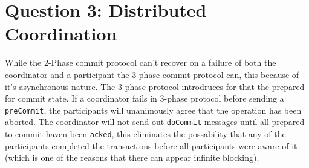\section{Question 3: Distributed Coordination}
While the 2-Phase commit protocol can't recover on a failure of both the coordinator and a participant the 3-phase commit protocol can, this because of it's asynchronous nature.
The 3-phase protocol introdruces for that the prepared for commit state.
If a coordinator fails in 3-phase protocol before sending a \texttt{preCommit}, the participants will unanimously agree that the operation has been aborted.
The coordinator will not send out \texttt{doCommit} messages until all prepared to commit haven been \texttt{acked}, this eliminates the possability that any of the participants completed the transactions before all participants were aware of it (which is one of the reasons that there can appear infinite blocking).